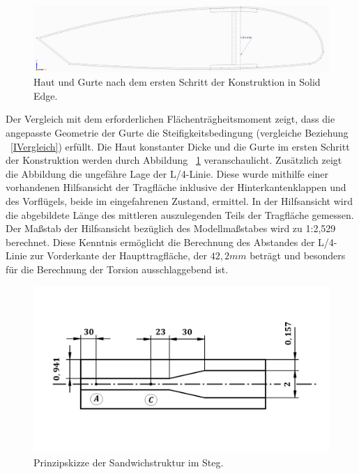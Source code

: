\begin{figure}[h]
	\includegraphics[width=1.0\textwidth]{Bilder/Kontur.jpg}
	\caption{Haut und Gurte nach dem ersten Schritt der Konstruktion in Solid Edge.}
	\label{fig: Kontur}
\end{figure} 
Der Vergleich mit dem erforderlichen Flächenträgheitsmoment zeigt, dass die angepasste Geometrie der Gurte die Steifigkeitsbedingung (vergleiche Beziehung ~\ref{IVergleich}) erfüllt. Die Haut konstanter Dicke und die Gurte im ersten Schritt der Konstruktion werden durch Abbildung ~\ref{fig: Kontur} veranschaulicht. Zusätzlich zeigt die Abbildung die ungefähre Lage der L/4-Linie. Diese wurde mithilfe einer vorhandenen Hilfsansicht der Tragfläche inklusive der Hinterkantenklappen und des Vorflügels, beide im eingefahrenen Zustand, ermittel. In der Hilfsansicht wird die abgebildete Länge des mittleren auszulegenden Teils der Tragfläche gemessen. Der Maßstab der Hilfsansicht bezüglich des Modellmaßstabes wird zu 1:2,529 berechnet. Diese Kenntnis ermöglicht die Berechnung des Abstandes der L/4-Linie zur Vorderkante der Haupttragfläche, der $ 42,2mm $ beträgt und besonders für die Berechnung der Torsion ausschlaggebend ist.\\

\begin{figure}[h]
	\includegraphics[width=1.0\textwidth]{Bilder/StegPrinzip.jpg}
	\caption{Prinzipskizze der Sandwichstruktur im Steg.}
	\label{fig: Steg}
\end{figure}



